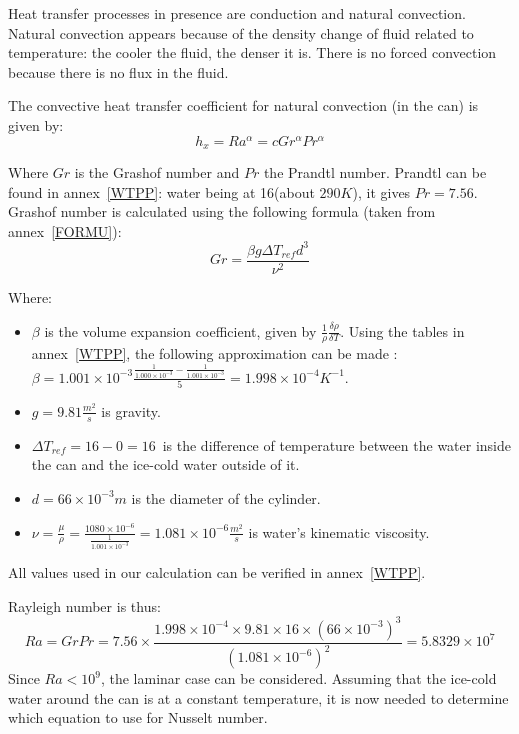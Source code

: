 \documentclass{report}
\begin{document}
	Heat transfer processes in presence are conduction and natural convection. Natural convection appears because of the density change of fluid related to temperature: the cooler the fluid, the denser it is. There is no forced convection because there is no flux in the fluid.
	
	The convective heat transfer coefficient for natural convection (in the can) is given by:
	\begin{equation}
		h_x=Ra^\alpha = cGr^\alpha Pr^\alpha
	\end{equation}
	
	Where $Gr$ is the Grashof number and $Pr$ the Prandtl number. Prandtl can be found in annex~\ref{WTPP}: water being at 16\textcelsius (about $290K$), it gives $Pr=7.56$.\\
	Grashof number is calculated using the following formula (taken from annex~\ref{FORMU}):
	\begin{equation}
	Gr=\frac{\beta g \Delta T_{ref} d^3}{\nu^2}
	\end{equation}
	
	Where:
	\begin{itemize}
		\item $\beta$ is the volume expansion coefficient, given by $\frac{1}{\rho}\frac{\delta\rho}{\delta T}$. Using the tables in annex~\ref{WTPP}, the following approximation can be made : $\beta=1.001\times 10^{-3}\frac{\frac{1}{1.000\times 10^{-3}}-\frac{1}{1.001\times 10^{-3}}}{5}=1.998\times 10^{-4} K^{-1}$.
		\item $g=9.81\frac{m^2}{s}$ is gravity.
		\item $\Delta T_{ref}=16-0=16$\textcelsius\ is the difference of temperature between the water inside the can and the ice-cold water outside of it.
		\item $d=66\times 10^{-3}m$ is the diameter of the cylinder.
		\item $\nu=\frac{\mu}{\rho}=\frac{1080\times 10^{-6}}{\frac{1}{1.001\times 10^{-3}}}=1.081\times 10^{-6}\frac{m^2}{s}$ is water's kinematic viscosity.
	\end{itemize}
	All values used in our calculation can be verified in annex~\ref{WTPP}.
	
	
	Rayleigh number is thus: 
	\begin{equation}
		Ra = GrPr= 7.56\times \frac{1.998\times 10^{-4}\times 9.81\times 16\times (66\times 10^{-3})^3}{(1.081\times 10^{-6})^2}= 5.8329\times 10^{7}
	\end{equation}
	Since $Ra<10^9$, the laminar case can be considered. Assuming that the ice-cold water around the can is at a constant temperature, it is now needed to determine which equation to use for Nusselt number.
	
\end{document}
